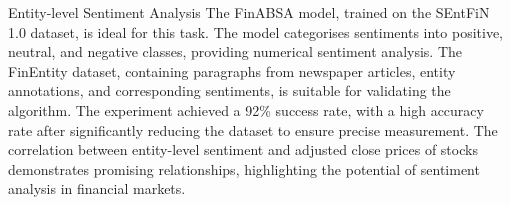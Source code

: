 Entity-level Sentiment Analysis
The FinABSA model, trained on the SEntFiN 1.0 dataset, is ideal for this task. The model categorises sentiments into positive, neutral, and negative classes, providing numerical sentiment analysis. The FinEntity dataset, containing paragraphs from newspaper articles, entity annotations, and corresponding sentiments, is suitable for validating the algorithm. The experiment achieved a 92\% success rate, with a high accuracy rate after significantly reducing the dataset to ensure precise measurement. The correlation between entity-level sentiment and adjusted close prices of stocks demonstrates promising relationships, highlighting the potential of sentiment analysis in financial markets.